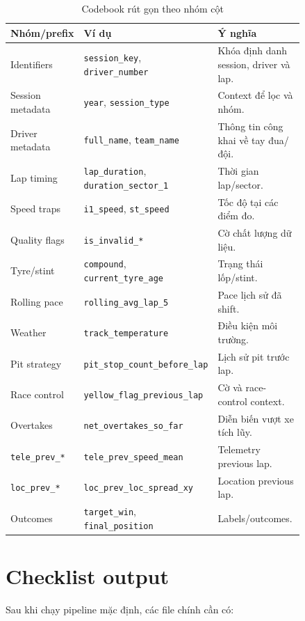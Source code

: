 \documentclass[conference]{IEEEtran}
\begin{document}
\begin{table}[htbp]
\caption{Codebook rút gọn theo nhóm cột}
\label{tab:codebook}
\centering
\begin{tabular}{p{0.20\linewidth}p{0.22\linewidth}p{0.42\linewidth}}
\toprule
Nhóm/prefix & Ví dụ & Ý nghĩa \\
\midrule
Identifiers & \texttt{session\_key}, \texttt{driver\_number} & Khóa định danh session, driver và lap. \\
Session metadata & \texttt{year}, \texttt{session\_type} & Context để lọc và nhóm. \\
Driver metadata & \texttt{full\_name}, \texttt{team\_name} & Thông tin công khai về tay đua/đội. \\
Lap timing & \texttt{lap\_duration}, \texttt{duration\_sector\_1} & Thời gian lap/sector. \\
Speed traps & \texttt{i1\_speed}, \texttt{st\_speed} & Tốc độ tại các điểm đo. \\
Quality flags & \texttt{is\_invalid\_*} & Cờ chất lượng dữ liệu. \\
Tyre/stint & \texttt{compound}, \texttt{current\_tyre\_age} & Trạng thái lốp/stint. \\
Rolling pace & \texttt{rolling\_avg\_lap\_5} & Pace lịch sử đã shift. \\
Weather & \texttt{track\_temperature} & Điều kiện môi trường. \\
Pit strategy & \texttt{pit\_stop\_count\_before\_lap} & Lịch sử pit trước lap. \\
Race control & \texttt{yellow\_flag\_previous\_lap} & Cờ và race-control context. \\
Overtakes & \texttt{net\_overtakes\_so\_far} & Diễn biến vượt xe tích lũy. \\
\texttt{tele\_prev\_*} & \texttt{tele\_prev\_speed\_mean} & Telemetry previous lap. \\
\texttt{loc\_prev\_*} & \texttt{loc\_prev\_loc\_spread\_xy} & Location previous lap. \\
Outcomes & \texttt{target\_win}, \texttt{final\_position} & Labels/outcomes. \\
\bottomrule
\end{tabular}
\end{table}

\section{Checklist output}
Sau khi chạy pipeline mặc định, các file chính cần có:
\end{document}
